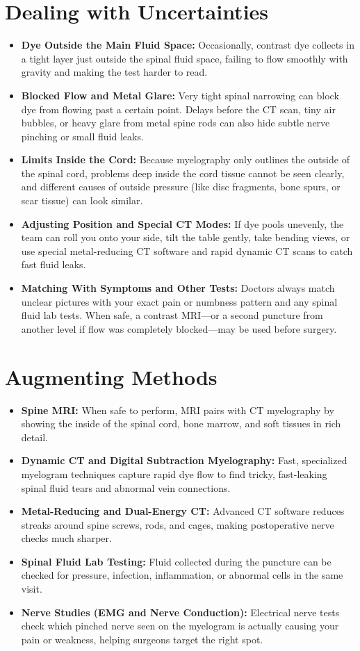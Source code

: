 \section{Dealing with Uncertainties}
\begin{itemize}
    \item \textbf{Dye Outside the Main Fluid Space:} Occasionally, contrast dye collects in a tight layer just outside the spinal fluid space, failing to flow smoothly with gravity and making the test harder to read.
    \item \textbf{Blocked Flow and Metal Glare:} Very tight spinal narrowing can block dye from flowing past a certain point. Delays before the CT scan, tiny air bubbles, or heavy glare from metal spine rods can also hide subtle nerve pinching or small fluid leaks.
    \item \textbf{Limits Inside the Cord:} Because myelography only outlines the outside of the spinal cord, problems deep inside the cord tissue cannot be seen clearly, and different causes of outside pressure (like disc fragments, bone spurs, or scar tissue) can look similar.
    \item \textbf{Adjusting Position and Special CT Modes:} If dye pools unevenly, the team can roll you onto your side, tilt the table gently, take bending views, or use special metal-reducing CT software and rapid dynamic CT scans to catch fast fluid leaks.
    \item \textbf{Matching With Symptoms and Other Tests:} Doctors always match unclear pictures with your exact pain or numbness pattern and any spinal fluid lab tests. When safe, a contrast MRI---or a second puncture from another level if flow was completely blocked---may be used before surgery.
\end{itemize}

\section{Augmenting Methods}
\begin{itemize}
    \item \textbf{Spine MRI:} When safe to perform, MRI pairs with CT myelography by showing the inside of the spinal cord, bone marrow, and soft tissues in rich detail.
    \item \textbf{Dynamic CT and Digital Subtraction Myelography:} Fast, specialized myelogram techniques capture rapid dye flow to find tricky, fast-leaking spinal fluid tears and abnormal vein connections.
    \item \textbf{Metal-Reducing and Dual-Energy CT:} Advanced CT software reduces streaks around spine screws, rods, and cages, making postoperative nerve checks much sharper.
    \item \textbf{Spinal Fluid Lab Testing:} Fluid collected during the puncture can be checked for pressure, infection, inflammation, or abnormal cells in the same visit.
    \item \textbf{Nerve Studies (EMG and Nerve Conduction):} Electrical nerve tests check which pinched nerve seen on the myelogram is actually causing your pain or weakness, helping surgeons target the right spot.
\end{itemize}

